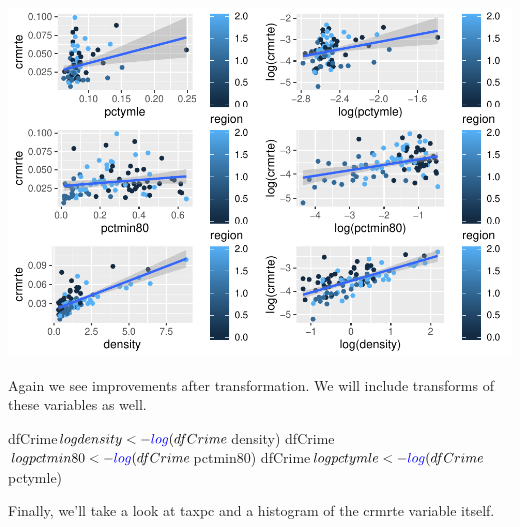 \documentclass[]{article}
\newenvironment{Shaded}{}{}
\newcommand{\KeywordTok}[1]{\textcolor[rgb]{0.00,0.00,1.00}{#1}}
\newcommand{\NormalTok}[1]{#1}
\newcommand{\OperatorTok}[1]{#1}
\newcommand{\StringTok}[1]{\textcolor[rgb]{0.00,0.50,0.50}{#1}}
\begin{document}
\includegraphics{Bagnard_Gaustad_Hartman_Leung_Lab_3_files/figure-latex/unnamed-chunk-54-1.pdf}

Again we see improvements after transformation. We will include
transforms of these variables as well.

\begin{Shaded}
\begin{Highlighting}[]
\NormalTok{dfCrime}\OperatorTok{$}\NormalTok{logdensity <-}\StringTok{ }\KeywordTok{log}\NormalTok{(dfCrime}\OperatorTok{$}\NormalTok{density)}
\NormalTok{dfCrime}\OperatorTok{$}\NormalTok{logpctmin80 <-}\StringTok{ }\KeywordTok{log}\NormalTok{(dfCrime}\OperatorTok{$}\NormalTok{pctmin80)}
\NormalTok{dfCrime}\OperatorTok{$}\NormalTok{logpctymle <-}\StringTok{ }\KeywordTok{log}\NormalTok{(dfCrime}\OperatorTok{$}\NormalTok{pctymle)}
\end{Highlighting}
\end{Shaded}

Finally, we'll take a look at taxpc and a histogram of the crmrte
variable itself.
\end{document}
